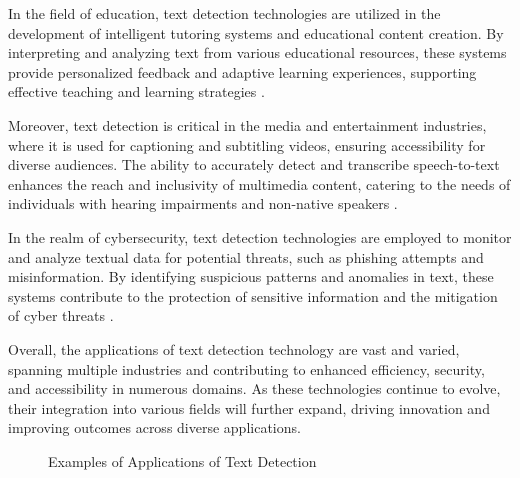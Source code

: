 In the field of education, text detection technologies are utilized in the development of intelligent tutoring systems and educational content creation. By interpreting and analyzing text from various educational resources, these systems provide personalized feedback and adaptive learning experiences, supporting effective teaching and learning strategies \cite{kasneci2023chatgpt}.



Moreover, text detection is critical in the media and entertainment industries, where it is used for captioning and subtitling videos, ensuring accessibility for diverse audiences. The ability to accurately detect and transcribe speech-to-text enhances the reach and inclusivity of multimedia content, catering to the needs of individuals with hearing impairments and non-native speakers \cite{thapliyal2022crossmodal3600massivelymultilingualmultimodal}.



In the realm of cybersecurity, text detection technologies are employed to monitor and analyze textual data for potential threats, such as phishing attempts and misinformation. By identifying suspicious patterns and anomalies in text, these systems contribute to the protection of sensitive information and the mitigation of cyber threats \cite{m2023comparativeanalysisimbalancedmalware}.



Overall, the applications of text detection technology are vast and varied, spanning multiple industries and contributing to enhanced efficiency, security, and accessibility in numerous domains. As these technologies continue to evolve, their integration into various fields will further expand, driving innovation and improving outcomes across diverse applications.






{
\begin{figure}[ht!]
\centering
{}\hspace{0.03\textwidth}
\hspace{0.03\textwidth}
\hspace{0.03\textwidth}
\caption{Examples of Applications of Text Detection}\label{fig:retrieve_fig_1}
\end{figure}
}


